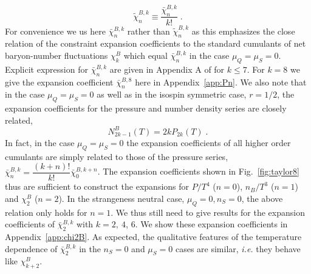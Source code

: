 \documentclass[pdflatex,prd,twocolumn,showpacs,superscriptaddress,nofootinbib]{revtex4-1}
\newcommand \cb {\bar{\chi}}
\begin{document}
\begin{equation}
    \tilde{\chi}_n^{B,k} \equiv \frac{{\cb}_n^{B,k}}{k!} \; .
\end{equation}
For convenience we us here ${\cb}_n^{B,k}$ rather than $\tilde{\chi}_n^{B,k }$ as this emphasizes the 
close relation of the constraint expansion coefficients to the standard cumulants of net baryon-number fluctuations $\chi_k^B$ which equal
${\cb}_n^{B,k}$ in the case $\mu_Q=\mu_S=0$. 
Explicit expression for $\bar{\chi}_n^{B,k}$ are 
given in Appendix A of \cite{Bazavov:2020bjn} for
$k\le 7$. For $k=8$ we give the expansion coefficient ${\cb}_n^{B,8}$ here in Appendix~\ref{app:Pn}.
We also note that in the case $\mu_Q=\mu_S=0$ as well as in the isospin symmetric case, $r=1/2$, the expansion coefficients for the pressure and number density series are closely related, 
\begin{equation}
    N_{2k-1}^B(T)=2k P_{2k}(T) \; .
\end{equation}
In fact, in the case 
$\mu_Q=\mu_S=0$ the expansion coefficients of all higher order 
cumulants are simply related to those of the pressure series, $\cb_n^{B,k}=\dfrac{(k+n)!}{k!}\cb_0^{B,k+n}$. The expansion coefficients shown
in Fig.~\ref{fig:taylor8} thus are 
sufficient to construct the expansions
for $P/T^4$ ($n=0$), $n_B/T^3$ ($n=1$)
and $\chi_2^B$ ($n=2$).
In the strangeness neutral case,
$\mu_Q=0,n_S=0$, the above relation 
only holds for $n=1$. We thus still
need to give results for the 
expansion coefficients of $\cb_2^{B,k}$
with $k=2,\ 4$, $6$. We show these 
expansion coefficients in Appendix~\ref{app:chi2B}. As expected, the qualitative features of the temperature dependence of $\cb_2^{B,k}$
in the $n_S=0$  and $\mu_S=0$ cases 
are similar, {\it i.e.} they behave like
$\chi_{k+2}^B$.
\end{document}

